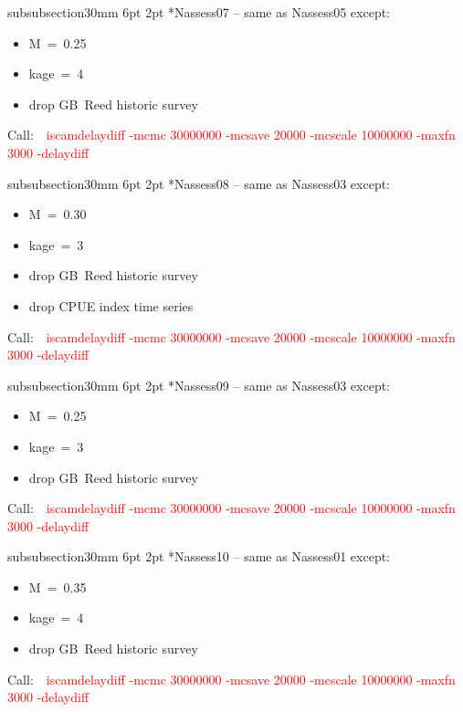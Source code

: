 \documentclass[11pt]{book}
\makeatletter
\newcommand{\red}[1]{{\textcolor{red} {#1}}}
\renewcommand{\subsubsection}{\@startsection%
{subsubsection}{3}{0mm}%
{6pt \@plus -0pt \@minus -0pt}{2pt \@plus 0pt}%
{\normalfont\bf}}%
\newcommand\call[1]{
\footnotesize\selectfont\hangindent=0.35in
Call:~~\red{#1}
\normalsize\selectfont}
\makeatother
\begin{document}
\subsubsection*{Nassess07 -- same as Nassess05 except:}
\begin{itemize}[nosep]
  \item M~=~0.25
  \item kage~=~4
  \item drop GB~Reed historic survey
\end{itemize}
\call{iscamdelaydiff -mcmc 30000000 -mcsave 20000 -mcscale 10000000 -maxfn 3000 -delaydiff}

\subsubsection*{Nassess08 -- same as Nassess03 except:}
\begin{itemize}[nosep]
  \item M~=~0.30
  \item kage~=~3
  \item drop GB~Reed historic survey
  \item drop CPUE index time series
\end{itemize}
\call{iscamdelaydiff -mcmc 30000000 -mcsave 20000 -mcscale 10000000 -maxfn 3000 -delaydiff}

\subsubsection*{Nassess09 -- same as Nassess03 except:}
\begin{itemize}[nosep]
  \item M~=~0.25
  \item kage~=~3
  \item drop GB~Reed historic survey
\end{itemize}
\call{iscamdelaydiff -mcmc 30000000 -mcsave 20000 -mcscale 10000000 -maxfn 3000 -delaydiff}

\subsubsection*{Nassess10 -- same as Nassess01 except:}
\begin{itemize}[nosep]
  \item M~=~0.35
  \item kage~=~4
  \item drop GB~Reed historic survey
\end{itemize}
\call{iscamdelaydiff -mcmc 30000000 -mcsave 20000 -mcscale 10000000 -maxfn 3000 -delaydiff}
\end{document}
